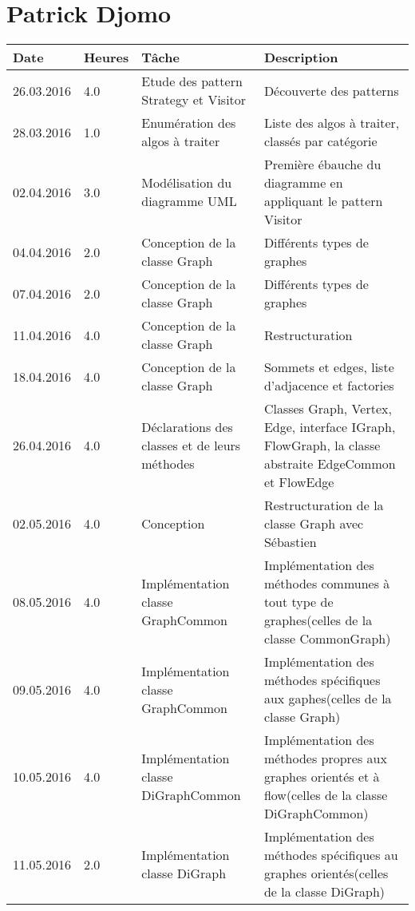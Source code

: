 \documentclass[french]{article}
\begin{document}
	\section*{Patrick Djomo}
	\begin{longtable}{p{}|p{}|p{}|p{}}
		Date&Heures&Tâche&Description\\
		\hline\hline
                26.03.2016 & 4.0 &Etude des pattern Strategy et Visitor&Découverte des patterns\\
               \hline
		28.03.2016 & 1.0&Enumération des algos à traiter&Liste des algos à traiter, classés par catégorie\\
		02.04.2016 &3.0&Modélisation du diagramme UML&Première ébauche du diagramme en appliquant le pattern Visitor\\
		\hline
		04.04.2016 & 2.0 &Conception de la classe Graph&Différents types de graphes\\
		07.04.2016 & 2.0   &Conception de la classe Graph&Différents types de graphes\\
		\hline
		11.04.2016 & 4.0 &Conception de la classe Graph&Restructuration\\
                \hline
                18.04.2016 &4.0&Conception de la classe Graph&Sommets et edges, liste d'adjacence et factories\\
		26.04.2016 & 4.0 &Déclarations des classes et de leurs méthodes&Classes Graph, Vertex, Edge, interface IGraph, FlowGraph,
                la classe abstraite EdgeCommon et FlowEdge\\
		\hline
                02.05.2016 & 4.0 & Conception & Restructuration de la classe Graph avec Sébastien\\
                \hline
                08.05.2016 & 4.0 & Implémentation classe GraphCommon &  Implémentation des méthodes communes à tout type de graphes(celles de la classe CommonGraph)\\
                 09.05.2016 & 4.0 & Implémentation classe GraphCommon &  Implémentation des méthodes spécifiques aux gaphes(celles de la classe Graph)\\
                \hline
                 10.05.2016 & 4.0 & Implémentation classe DiGraphCommon &  Implémentation des méthodes propres aux graphes orientés et à flow(celles de la classe DiGraphCommon)\\
                11.05.2016 & 2.0 & Implémentation classe DiGraph &  Implémentation des méthodes spécifiques au graphes orientés(celles de la classe DiGraph)\\

\end{longtable}
\end{document}
